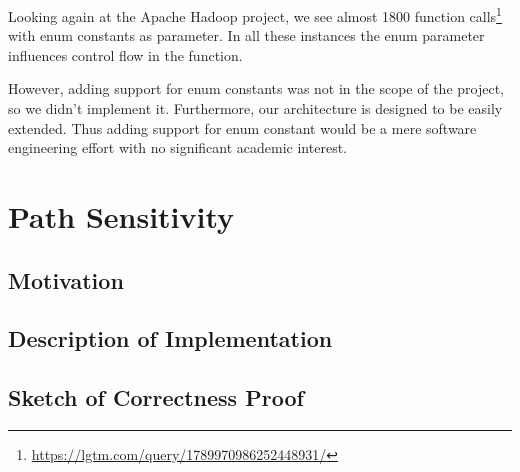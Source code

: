 Looking again at the Apache Hadoop project, we see almost 1800
function calls\footnote{\url{https://lgtm.com/query/1789970986252448931/}} with enum constants as parameter.
In all these instances the enum parameter influences control flow in the function.

However, adding support for enum constants was not in the scope of the project, so we didn't implement it.
Furthermore, our architecture is designed to be easily extended.
Thus adding support for enum constant would be a mere software engineering effort
with no significant academic interest.


\newpage
\section{Path Sensitivity}
\subsection{Motivation}
\subsection{Description of Implementation}
\subsection{Sketch of Correctness Proof}




